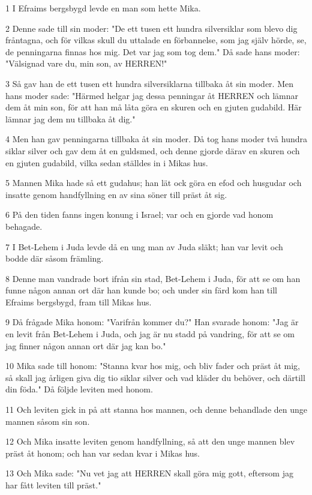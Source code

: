 \par 1 I Efraims bergsbygd levde en man som hette Mika.
\par 2 Denne sade till sin moder: "De ett tusen ett hundra silversiklar som blevo dig fråntagna, och för vilkas skull du uttalade en förbannelse, som jag själv hörde, se, de penningarna finnas hos mig. Det var jag som tog dem." Då sade hans moder: "Välsignad vare du, min son, av HERREN!"
\par 3 Så gav han de ett tusen ett hundra silversiklarna tillbaka åt sin moder. Men hans moder sade: "Härmed helgar jag dessa penningar åt HERREN och lämnar dem åt min son, för att han må låta göra en skuren och en gjuten gudabild. Här lämnar jag dem nu tillbaka åt dig."
\par 4 Men han gav penningarna tillbaka åt sin moder. Då tog hans moder två hundra siklar silver och gav dem åt en guldsmed, och denne gjorde därav en skuren och en gjuten gudabild, vilka sedan ställdes in i Mikas hus.
\par 5 Mannen Mika hade så ett gudahus; han lät ock göra en efod och husgudar och insatte genom handfyllning en av sina söner till präst åt sig.
\par 6 På den tiden fanns ingen konung i Israel; var och en gjorde vad honom behagade.
\par 7 I Bet-Lehem i Juda levde då en ung man av Juda släkt; han var levit och bodde där såsom främling.
\par 8 Denne man vandrade bort ifrån sin stad, Bet-Lehem i Juda, för att se om han funne någon annan ort där han kunde bo; och under sin färd kom han till Efraims bergsbygd, fram till Mikas hus.
\par 9 Då frågade Mika honom: "Varifrån kommer du?" Han svarade honom: "Jag är en levit från Bet-Lehem i Juda, och jag är nu stadd på vandring, för att se om jag finner någon annan ort där jag kan bo."
\par 10 Mika sade till honom: "Stanna kvar hos mig, och bliv fader och präst åt mig, så skall jag årligen giva dig tio siklar silver och vad kläder du behöver, och därtill din föda." Då följde leviten med honom.
\par 11 Och leviten gick in på att stanna hos mannen, och denne behandlade den unge mannen såsom sin son.
\par 12 Och Mika insatte leviten genom handfyllning, så att den unge mannen blev präst åt honom; och han var sedan kvar i Mikas hus.
\par 13 Och Mika sade: "Nu vet jag att HERREN skall göra mig gott, eftersom jag har fått leviten till präst."

